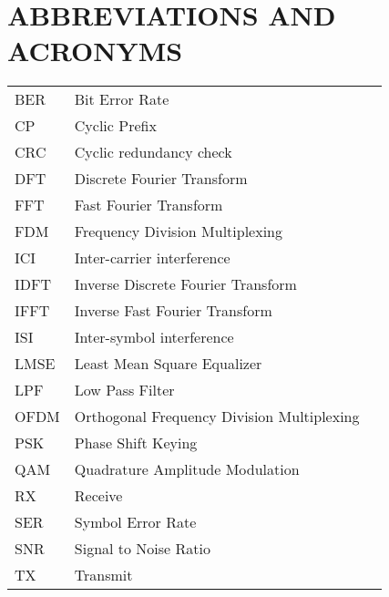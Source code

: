 \section*{ABBREVIATIONS AND ACRONYMS}
 {}

\begin{tabularx}{0.9\textwidth}{ L{0.4} L{1.3} L{1.3} }
    BER     & Bit Error Rate \\ %
    CP      & Cyclic Prefix \\ %
    CRC     & Cyclic redundancy check \\
    DFT     & Discrete Fourier Transform \\
    FFT     & Fast Fourier Transform \\
    FDM     & Frequency Division Multiplexing \\ %
    ICI     & Inter-carrier interference \\ %
    IDFT    & Inverse Discrete Fourier Transform \\
    IFFT    & Inverse Fast Fourier Transform \\
    ISI     & Inter-symbol interference \\ %
    LMSE    & Least Mean Square Equalizer \\ %
    LPF     & Low Pass Filter \\
    OFDM    & Orthogonal Frequency Division Multiplexing \\ %
    PSK     & Phase Shift Keying \\ %
    QAM     & Quadrature Amplitude Modulation \\ %
    RX      & Receive \\
    SER     & Symbol Error Rate \\ %
    SNR     & Signal to Noise Ratio \\ %
    TX      & Transmit \\
\end{tabularx}

\newpage